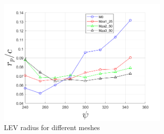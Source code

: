 \begin{figure}[H]
	\centering
	\includegraphics[width=0.75\textwidth]{figures/zonal_adapt_results/LEV/LEV_radius_vp}
	\caption{ LEV radius for different meshes}
	\label{fig:zonal_LEV_radius}
\end{figure}




